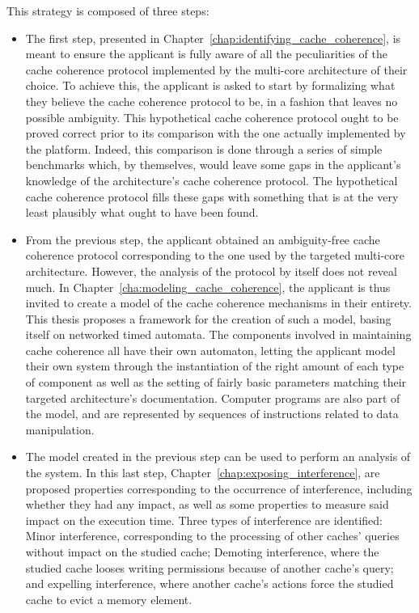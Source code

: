 This strategy is composed of three steps:
\begin{itemize}
\item
The first step, presented in
Chapter~\ref{chap:identifying_cache_coherence}, is meant to ensure the
applicant is fully aware of all the peculiarities of the cache coherence
protocol implemented by the multi-core architecture of their choice. To achieve
this, the applicant is asked to start by formalizing what they believe the
cache coherence protocol to be, in a fashion that leaves no possible ambiguity.
This hypothetical cache coherence protocol ought to be proved correct prior to
its comparison with the one actually implemented by the platform. Indeed, this
comparison is done through a series of simple benchmarks which, by themselves,
would leave some gaps in the applicant's knowledge of the architecture's cache
coherence protocol. The hypothetical cache coherence protocol fills these gaps
with something that is at the very least plausibly what ought to have been
found.

\item
From the previous step, the applicant obtained an ambiguity-free cache
coherence protocol corresponding to the one used by the targeted multi-core
architecture. However, the analysis of the protocol by itself does not reveal
much. In Chapter~\ref{cha:modeling_cache_coherence}, the applicant is thus
invited to create a model of the cache coherence mechanisms in their entirety.
This thesis proposes a framework for the creation of such a model, basing
itself on networked timed automata. The components involved in maintaining
cache coherence all have their own automaton, letting the applicant model their
own system through the instantiation of the right amount of each type of
component as well as the setting of fairly basic parameters matching their
targeted architecture's documentation. Computer programs are also part of the
model, and are represented by sequences of instructions related to data
manipulation.

\item
The model created in the previous step can be used to perform an analysis of
the system. In this last step, Chapter~\ref{chap:exposing_interference}, are
proposed properties corresponding to the occurrence of interference, including
whether they had any impact, as well as some properties to measure said impact
on the execution time. Three types of interference are identified: Minor
interference, corresponding to the processing of other caches' queries without
impact on the studied cache; Demoting interference, where the studied cache
looses writing permissions because of another cache's query; and expelling
interference, where another cache's actions force the studied cache to evict a
memory element.
\end{itemize}

